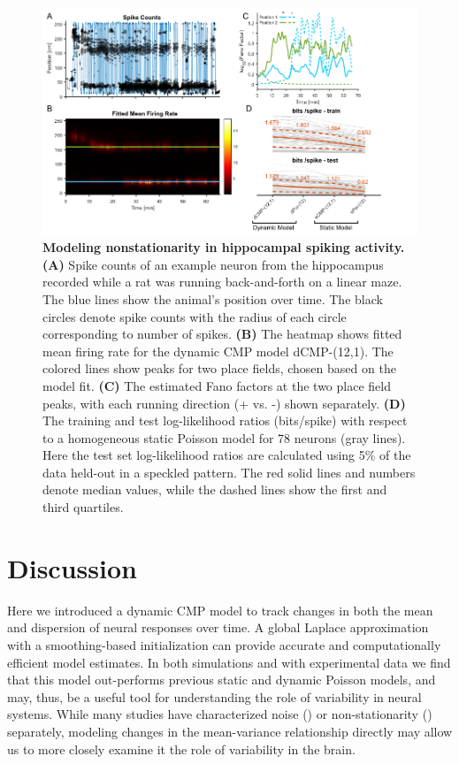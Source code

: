 \documentclass[aoas]{imsart}
\theoremstyle{plain}
\theoremstyle{remark}
\begin{document}
\begin{figure}[h!]
	\centering
	\includegraphics[width=1\textwidth]{figure5.png}
	\caption{\textbf{Modeling nonstationarity in hippocampal spiking activity. (A)} Spike counts of an example neuron from the hippocampus recorded while a rat was running back-and-forth on a linear maze. The blue lines show the animal’s position over time. The black circles denote spike counts with the radius of each circle corresponding to number of spikes. \textbf{(B)} The heatmap shows fitted mean firing rate for the dynamic CMP model dCMP-(12,1). The colored lines show peaks for two place fields, chosen based on the model fit. \textbf{(C)} The estimated Fano factors at the two place field peaks, with each running direction (+ vs. -) shown separately. \textbf{(D)} The training and test log-likelihood ratios (bits/spike) with respect to a homogeneous static Poisson model for 78 neurons (gray lines). Here the test set log-likelihood ratios are calculated using 5\% of the data held-out in a speckled pattern. The red solid lines and numbers denote median values, while the dashed lines show the first and third quartiles.}
	\label{fig5}
\end{figure}

\section{Discussion}
Here we introduced a dynamic CMP model to track changes in both the mean and dispersion of neural responses over time. A global Laplace approximation with a smoothing-based initialization can provide accurate and computationally efficient model estimates. In both simulations and with experimental data we find that this model out-performs previous static and dynamic Poisson models, and may, thus, be a useful tool for understanding the role of variability in neural systems. While many studies have characterized noise (\cite{DeWeese2003,Deweese2004,Taouali2016}) or non-stationarity (\cite{Tomko1974,Wu2008}) separately, modeling changes in the mean-variance relationship directly may allow us to more closely examine it the role of variability in the brain. 
\end{document}
